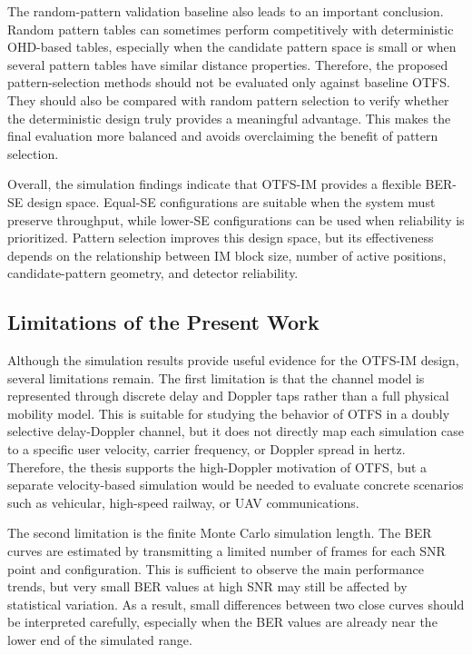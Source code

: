 The random-pattern validation baseline also leads to an important conclusion. Random pattern tables can sometimes perform competitively with deterministic OHD-based tables, especially when the candidate pattern space is small or when several pattern tables have similar distance properties. Therefore, the proposed pattern-selection methods should not be evaluated only against baseline OTFS. They should also be compared with random pattern selection to verify whether the deterministic design truly provides a meaningful advantage. This makes the final evaluation more balanced and avoids overclaiming the benefit of pattern selection.

Overall, the simulation findings indicate that OTFS-IM provides a flexible BER-SE design space. Equal-SE configurations are suitable when the system must preserve throughput, while lower-SE configurations can be used when reliability is prioritized. Pattern selection improves this design space, but its effectiveness depends on the relationship between IM block size, number of active positions, candidate-pattern geometry, and detector reliability.

\subsection{Limitations of the Present Work}

Although the simulation results provide useful evidence for the OTFS-IM design, several limitations remain. The first limitation is that the channel model is represented through discrete delay and Doppler taps rather than a full physical mobility model. This is suitable for studying the behavior of OTFS in a doubly selective delay-Doppler channel, but it does not directly map each simulation case to a specific user velocity, carrier frequency, or Doppler spread in hertz. Therefore, the thesis supports the high-Doppler motivation of OTFS, but a separate velocity-based simulation would be needed to evaluate concrete scenarios such as vehicular, high-speed railway, or UAV communications.

The second limitation is the finite Monte Carlo simulation length. The BER curves are estimated by transmitting a limited number of frames for each SNR point and configuration. This is sufficient to observe the main performance trends, but very small BER values at high SNR may still be affected by statistical variation. As a result, small differences between two close curves should be interpreted carefully, especially when the BER values are already near the lower end of the simulated range.

